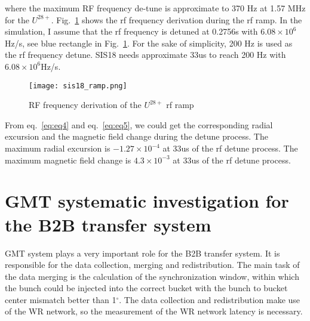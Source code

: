 where the maximum RF frequency de-tune is approximate to 370 Hz at 1.57 MHz for the $U^{ 28+}$. Fig.~\ref{sis18_ramp} shows the rf frequency derivation during the rf ramp. In the simulation, I assume that the rf frequency is detuned at 0.2756s with $6.08 \times 10^{6}$Hz/s, see blue rectangle in Fig.~\ref{sis18_ramp}. For the sake of simplicity, 200 Hz is used as the rf frequency detune. SIS18 needs approximate 33us to reach 200 Hz with $6.08 \times 10^{6}$Hz/s.
\begin{figure}[!htb]
   \centering   
   \texttt{[image: sis18\_ramp.png]}
   \caption{RF frequency derivation of the $U^{28+}$ rf ramp}
   \label{sis18_ramp}
\end{figure}


From eq.~\ref{eq:eq4} and eq.~\ref{eq:eq5}, we could get the corresponding radial excursion and the magnetic field change during the detune process. The maximum radial excursion is $-1.27 \times 10^{-4}$ at 33us of the rf detune process. The maximum magnetic field change is $4.3 \times 10^{-3}$ at 33us of the rf detune process.
 
\section{GMT systematic investigation for the B2B transfer system}
GMT system plays a very important role for the B2B transfer system. It is responsible for the data collection, merging and redistribution. The main task of the data merging is the calculation of the synchronization window, within which the bunch could be injected into the correct bucket with the bunch to bucket center mismatch better than 1$^\circ$. The data collection and redistribution make use of the WR network, so the measurement of the WR network latency is necessary. 

